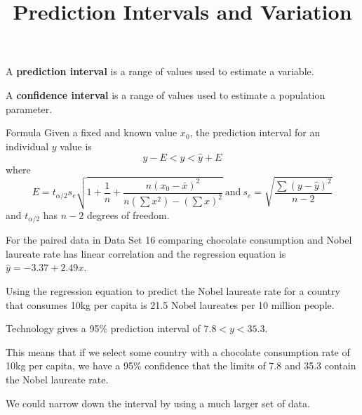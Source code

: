 \documentclass{beamer}
\title[MA205 - Section 10.3]{Prediction Intervals and Variation}
\begin{document}
\begin{frame}
\titlepage
\end{frame}

\begin{frame}
\begin{definition}
A \textbf{prediction interval} is a range of values used to estimate a variable.
\end{definition}\pause

\begin{definition}
A \textbf{confidence interval} is a range of values used to estimate a population parameter.
\end{definition}\pause

\begin{block}{Formula}
Given a fixed and known value $x_0$, the prediction interval for an individual $y$ value is
\begin{equation*}
\hat{y} - E < y < \hat{y} + E
\end{equation*}
where 
\begin{equation*}
E=t_{\alpha/2} s_e\sqrt{1+\dfrac{1}{n}+\dfrac{n{(x_0-\bar{x})}^2}{n(\sum x^2)-{(\sum x)}^2}}
~\text{and}~
s_e=\sqrt{\dfrac{\sum{(y-\hat{y})}^2}{n-2}}
\end{equation*}
and $t_{\alpha/2}$ has $n-2$ degrees of freedom.
\end{block}
\end{frame}

\begin{frame}
\begin{example}
For the paired data in Data Set 16 comparing chocolate consumption and Nobel laureate rate has linear correlation and the regression equation is $\hat{y}=-3.37+2.49x$.\pause

\vspace{2mm}
Using the regression equation to predict the Nobel laureate rate for a country that consumes 10kg per capita is 21.5 Nobel laureates per 10 million people.\pause

\vspace{2mm}
Technology gives a 95\% prediction interval of $7.8<y<35.3$.\pause

\vspace{2mm}
This means that if we select some country with a chocolate consumption rate of 10kg per capita, we have a 95\% confidence that the limits of 7.8 and 35.3 contain the Nobel laureate rate.\pause
\end{example}

\begin{note}
We could narrow down the interval by using a much larger set of data.
\end{note}
\end{frame}
\end{document}
